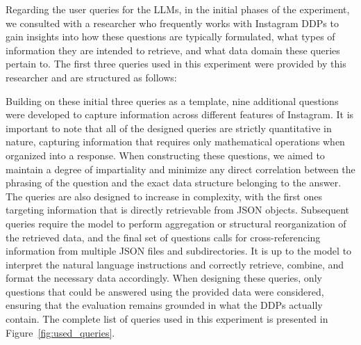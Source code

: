 \documentclass{DESSThesis}
\begin{document}
Regarding the user queries for the LLMs, in the initial phases of the experiment, we consulted with a researcher who frequently works with Instagram DDPs to gain insights into how these questions are typically formulated, what types of information they are intended to retrieve, and what data domain these queries pertain to. The first three queries used in this experiment were provided by this researcher and are structured as follows:

\begin{figure}[ht]
    \centering
\end{figure}

Building on these initial three queries as a template, nine additional questions were developed to capture information across different features of Instagram. It is important to note that all of the designed queries are strictly quantitative in nature, capturing information that requires only mathematical operations when organized into a response. When constructing these questions, we aimed to maintain a degree of impartiality and minimize any direct correlation between the phrasing of the question and the exact data structure belonging to the answer. The queries are also designed to increase in complexity, with the first ones targeting information that is directly retrievable from JSON objects. Subsequent queries require the model to perform aggregation or structural reorganization of the retrieved data, and the final set of questions calls for cross-referencing information from multiple JSON files and subdirectories. It is up to the model to interpret the natural language instructions and correctly retrieve, combine, and format the necessary data accordingly. When designing these queries, only questions that could be answered using the provided data were considered, ensuring that the evaluation remains grounded in what the DDPs actually contain. The complete list of queries used in this experiment is presented in Figure~\ref{fig:used_queries}.
\end{document}

